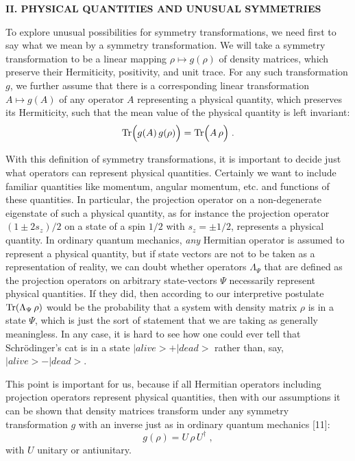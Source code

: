 \documentclass[12pt]{article}
\begin{document}
\vspace{20pt}

\begin{center}
{\bf II. PHYSICAL QUANTITIES AND UNUSUAL SYMMETRIES}
\end{center}



To explore  unusual possibilities for symmetry transformations, we need first to say what we mean by a symmetry transformation.  
We will take a symmetry transformation to be a linear mapping $\rho\mapsto g(\rho)$ of density matrices,  which preserve their Hermiticity, positivity,  and unit trace.  For any such transformation $g$, we further assume that there is a corresponding linear transformation $A\mapsto g(A)$ of any operator $A$ representing a physical quantity, which preserves its Hermiticity,  such that the mean value of the physical quantity is left invariant:
\begin{equation}
{\rm Tr} \Big(g(A)\,g(\rho)\Big)={\rm Tr} \Big(A\,\rho\Big)\;.
\end{equation}

With this definition of symmetry transformations, it is important to decide just what operators can represent physical quantities.  Certainly we want to include familiar quantities like momentum, angular momentum, etc. and functions of these quantities.  In particular, the projection operator on a non-degenerate eigenstate of such a physical quantity, as for instance the projection operator $(1\pm2s_z)/2$ on a state of a spin $1/2$ with $s_z=\pm 1/2$, represents a physical quantity.   In ordinary quantum mechanics, {\em any} Hermitian operator is assumed to represent a physical quantity, but if state vectors are not to be taken as a representation of reality, we can doubt whether  operators $\Lambda_\Psi$  that are defined  as the projection operators on arbitrary state-vectors $\Psi$  necessarily represent   physical quantities.  If they did, then according to our interpretive postulate ${\rm Tr}(\Lambda_\Psi\,\rho)$ would be the probability that a system with density matrix $\rho$ is in a state $\Psi$, which is just the sort of statement that we are taking as generally meaningless.  In any case, it is hard to see how one could ever tell that Schr\"{o}dinger's cat is in a state $|alive>+|dead>$ rather than, say, $|alive>-|dead>$.  

This point is important for us,  because  if all Hermitian operators including projection operators represent physical quantities, then with our assumptions it can be shown that density matrices transform under any symmetry transformation $g$ with an inverse just as in ordinary quantum mechanics [11]:
\begin{equation}
 g(\rho)=U\,\rho\,U^\dagger\;,
\end{equation}
with $U$ unitary or antiunitary.
\end{document}
